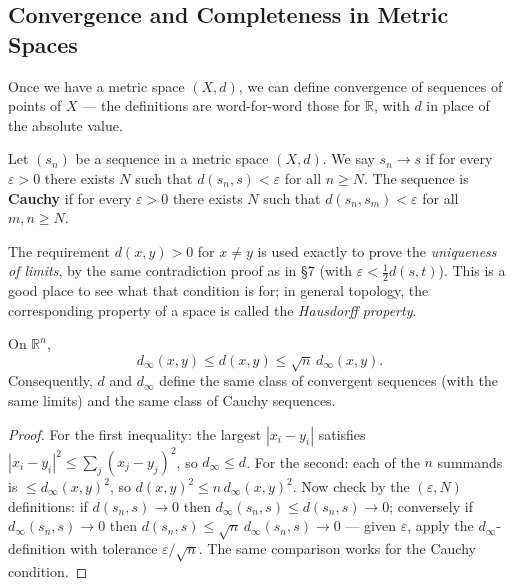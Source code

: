 \documentclass[11pt]{report}
\begin{document}
\subsection{Convergence and Completeness in Metric Spaces}

Once we have a metric space $(X, d)$, we can define convergence of sequences of points of $X$ --- the definitions are word-for-word those for $\mathbb{R}$, with $d$ in place of the absolute value.

\begin{defbox}
Let $(s_n)$ be a sequence in a metric space $(X,d)$. We say $s_n \to s$ if for every $\varepsilon > 0$ there exists $N$ such that $d(s_n, s) < \varepsilon$ for all $n \geq N$. The sequence is \textbf{Cauchy} if for every $\varepsilon > 0$ there exists $N$ such that $d(s_n, s_m) < \varepsilon$ for all $m, n \geq N$.
\end{defbox}

\begin{rembox}
The requirement $d(x,y) > 0$ for $x \neq y$ is used exactly to prove the \emph{uniqueness of limits}, by the same contradiction proof as in \S 7 (with $\varepsilon < \tfrac12 d(s,t)$). This is a good place to see what that condition is for; in general topology, the corresponding property of a space is called the \emph{Hausdorff property}.
\end{rembox}

\begin{propbox}
On $\mathbb{R}^n$,
\[
d_\infty(x,y) \leq d(x,y) \leq \sqrt{n}\, d_\infty(x,y).
\]
Consequently, $d$ and $d_\infty$ define the same class of convergent sequences (with the same limits) and the same class of Cauchy sequences.
\end{propbox}

\begin{proof}
For the first inequality: the largest $|x_i - y_i|$ satisfies $|x_i - y_i|^2 \leq \sum_j (x_j - y_j)^2$, so $d_\infty \leq d$. For the second: each of the $n$ summands is $\leq d_\infty(x,y)^2$, so $d(x,y)^2 \leq n\, d_\infty(x,y)^2$. Now check by the $(\varepsilon, N)$ definitions: if $d(s_n, s) \to 0$ then $d_\infty(s_n, s) \leq d(s_n,s) \to 0$; conversely if $d_\infty(s_n,s) \to 0$ then $d(s_n,s) \leq \sqrt{n}\, d_\infty(s_n,s) \to 0$ --- given $\varepsilon$, apply the $d_\infty$-definition with tolerance $\varepsilon/\sqrt{n}$. The same comparison works for the Cauchy condition.
\end{proof}
\end{document}
